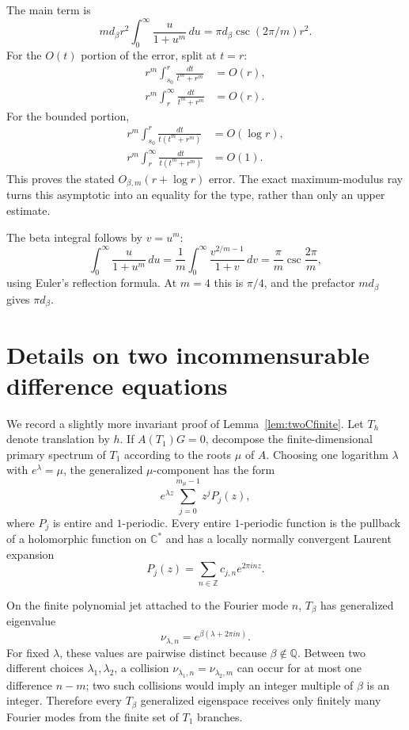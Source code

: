 \documentclass[11pt,oneside]{article}
\theoremstyle{definition}
\theoremstyle{remark}
\newcommand{\Z}{\mathbb Z}
\newcommand{\Q}{\mathbb Q}
\newcommand{\C}{\mathbb C}
\begin{document}
The main term is
\[
 m d_\beta r^2\int_0^\infty\frac{u}{1+u^m}\,du
 =\pi d_\beta\csc(2\pi/m)r^2.
\]
For the $O(t)$ portion of the error, split at $t=r$:
\begin{align*}
 r^m\int_{s_0}^{r}\frac{dt}{t^m+r^m}&=O(r),\\
 r^m\int_r^\infty\frac{dt}{t^m+r^m}&=O(r).
\end{align*}
For the bounded portion,
\begin{align*}
 r^m\int_{s_0}^{r}\frac{dt}{t(t^m+r^m)}&=O(\log r),\\
 r^m\int_r^\infty\frac{dt}{t(t^m+r^m)}&=O(1).
\end{align*}
This proves the stated $O_{\beta,m}(r+\log r)$ error.  The exact maximum-modulus ray turns
this asymptotic into an equality for the type, rather than only an upper estimate.

The beta integral follows by $v=u^m$:
\[
 \int_0^\infty\frac{u}{1+u^m}\,du
 =\frac1m\int_0^\infty\frac{v^{2/m-1}}{1+v}\,dv
 =\frac\pi m\csc\frac{2\pi}{m},
\]
using Euler's reflection formula.  At $m=4$ this is $\pi/4$, and the prefactor $m d_\beta$
gives $\pi d_\beta$.

\section{Details on two incommensurable difference equations}
\label{app:difference}

We record a slightly more invariant proof of Lemma~\ref{lem:twoCfinite}.  Let $T_h$ denote
translation by $h$.  If $A(T_1)G=0$, decompose the finite-dimensional primary spectrum of
$T_1$ according to the roots $\mu$ of $A$.  Choosing one logarithm $\lambda$ with
$e^\lambda=\mu$, the generalized $\mu$-component has the form
\[
 e^{\lambda z}\sum_{j=0}^{m_\mu-1}z^jP_j(z),
\]
where $P_j$ is entire and $1$-periodic.  Every entire $1$-periodic function is the pullback
of a holomorphic function on $\C^*$ and has a locally normally convergent Laurent expansion
\[
 P_j(z)=\sum_{n\in\Z}c_{j,n}e^{2\pi i n z}.
\]

On the finite polynomial jet attached to the Fourier mode $n$, $T_\beta$ has generalized
eigenvalue
\[
 \nu_{\lambda,n}=e^{\beta(\lambda+2\pi i n)}.
\]
For fixed $\lambda$, these values are pairwise distinct because $\beta\notin\Q$.  Between
two different choices $\lambda_1,\lambda_2$, a collision
$\nu_{\lambda_1,n}=\nu_{\lambda_2,m}$ can occur for at most one difference $n-m$; two such
collisions would imply an integer multiple of $\beta$ is an integer.  Therefore every
$T_\beta$ generalized eigenspace receives only finitely many Fourier modes from the finite
set of $T_1$ branches.
\end{document}
